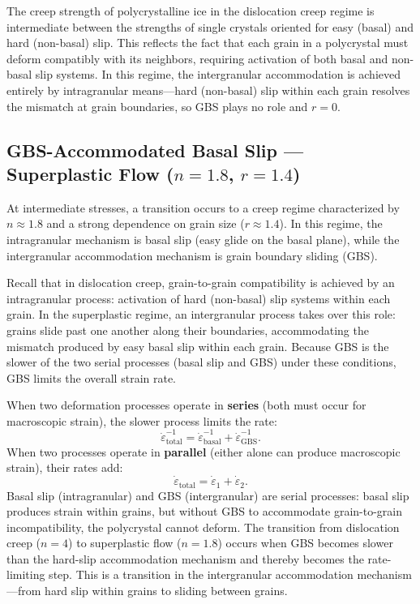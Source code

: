 \documentclass[11pt]{article}
\begin{document}
\medskip
\noindent The creep strength of polycrystalline ice in the dislocation creep regime is intermediate between the strengths of single crystals oriented for easy (basal) and hard (non-basal) slip.  This reflects the fact that each grain in a polycrystal must deform compatibly with its neighbors, requiring activation of both basal and non-basal slip systems.  In this regime, the intergranular accommodation is achieved entirely by intragranular means---hard (non-basal) slip within each grain resolves the mismatch at grain boundaries, so GBS plays no role and $r = 0$.

\subsection{GBS-Accommodated Basal Slip --- Superplastic Flow ($n = 1.8$, $r = 1.4$)}
\label{sec:superplastic}

At intermediate stresses, a transition occurs to a creep regime characterized by $n \approx 1.8$ and a strong dependence on grain size ($r \approx 1.4$).  In this regime, the intragranular mechanism is basal slip (easy glide on the basal plane), while the intergranular accommodation mechanism is grain boundary sliding (GBS).

\medskip
\noindent Recall that in dislocation creep, grain-to-grain compatibility is achieved by an intragranular process: activation of hard (non-basal) slip systems within each grain.  In the superplastic regime, an intergranular process takes over this role: grains slide past one another along their boundaries, accommodating the mismatch produced by easy basal slip within each grain.  Because GBS is the slower of the two serial processes (basal slip and GBS) under these conditions, GBS limits the overall strain rate.

\begin{tcolorbox}[
  colback=blue!5,
  colframe=blue!50!black,
  title={\textbf{Key point: serial vs.\ parallel processes}}
]
When two deformation processes operate in \textbf{series} (both must occur for macroscopic strain), the slower process limits the rate:
\begin{equation}
  \dot{\varepsilon}_{\text{total}}^{-1} = \dot{\varepsilon}_{\text{basal}}^{-1} + \dot{\varepsilon}_{\text{GBS}}^{-1}.
\end{equation}
When two processes operate in \textbf{parallel} (either alone can produce macroscopic strain), their rates add:
\begin{equation}
  \dot{\varepsilon}_{\text{total}} = \dot{\varepsilon}_1 + \dot{\varepsilon}_2.
\end{equation}
Basal slip (intragranular) and GBS (intergranular) are serial processes: basal slip produces strain within grains, but without GBS to accommodate grain-to-grain incompatibility, the polycrystal cannot deform.  The transition from dislocation creep ($n = 4$) to superplastic flow ($n = 1.8$) occurs when GBS becomes slower than the hard-slip accommodation mechanism and thereby becomes the rate-limiting step.  This is a transition in the intergranular accommodation mechanism---from hard slip within grains to sliding between grains.
\end{tcolorbox}
\end{document}
